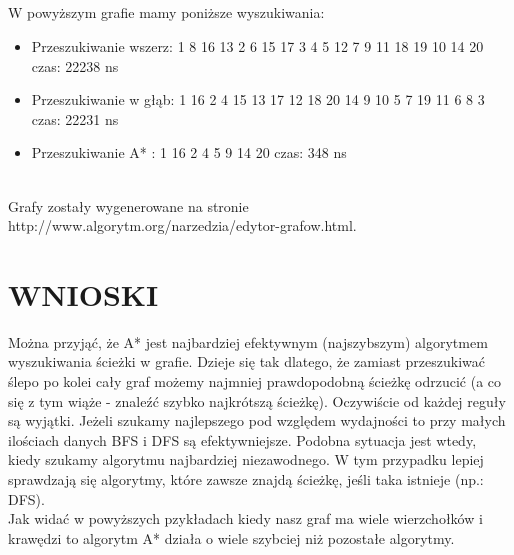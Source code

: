 \documentclass[11pt]{article}
\begin{document}
\\ \\ \\ \\W powyższym grafie  mamy poniższe wyszukiwania: \\ \begin{itemize}
\item Przeszukiwanie wszerz: 1 8 16 13 2 6 15 17 3 4 5 12 7 9 11 18 19 10 14 20	czas:	22238 ns
\item Przeszukiwanie w głąb: 1 16 2 4 15 13 17 12 18 20 14 9 10 5 7 19 11 6 8 3 	czas:	22231 ns
\item Przeszukiwanie A* : 1 16 2 4 5 9 14 20		czas:	348 ns\\ \\
\end{itemize}
Grafy zostały wygenerowane na stronie http://www.algorytm.org/narzedzia/edytor-grafow.html.
\section{WNIOSKI}
Można przyjąć, że A* jest najbardziej efektywnym (najszybszym) algorytmem wyszukiwania ścieżki w grafie. Dzieje się tak dlatego, że zamiast przeszukiwać ślepo po kolei cały graf możemy najmniej prawdopodobną ścieżkę odrzucić (a co się z tym wiąże - znaleźć szybko najkrótszą ścieżkę). Oczywiście od każdej reguły są wyjątki. Jeżeli szukamy najlepszego pod względem wydajności to przy małych ilościach danych BFS i DFS są efektywniejsze. Podobna sytuacja jest wtedy, kiedy szukamy algorytmu najbardziej niezawodnego. W tym przypadku lepiej sprawdzają się algorytmy, które zawsze znajdą ścieżkę, jeśli taka istnieje (np.: DFS). \\
Jak widać w powyższych pzykładach kiedy nasz graf ma wiele wierzchołków i krawędzi to algorytm A* działa o wiele szybciej niż pozostałe algorytmy.
\end{document}
